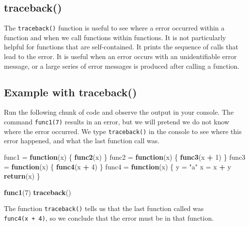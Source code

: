 \documentclass[
]{book}
\newenvironment{Shaded}{\begin{snugshade}}{\end{snugshade}}
\newcommand{\ControlFlowTok}[1]{\textcolor[rgb]{0.13,0.29,0.53}{\textbf{#1}}}
\newcommand{\DecValTok}[1]{\textcolor[rgb]{0.00,0.00,0.81}{#1}}
\newcommand{\KeywordTok}[1]{\textcolor[rgb]{0.13,0.29,0.53}{\textbf{#1}}}
\newcommand{\NormalTok}[1]{#1}
\newcommand{\OperatorTok}[1]{\textcolor[rgb]{0.81,0.36,0.00}{\textbf{#1}}}
\newcommand{\StringTok}[1]{\textcolor[rgb]{0.31,0.60,0.02}{#1}}
\begin{document}
\hypertarget{traceback}{%
\subsection{traceback()}\label{traceback}}

The \texttt{traceback()} function is useful to see where a error occurred within a function and when we call functions within functions. It is not particularly helpful for functions that are self-contained. It prints the sequence of calls that lead to the error. It is useful when an error occurs with an unidentifiable error message, or a large series of error messages is produced after calling a function.

\hypertarget{example-with-traceback}{%
\subsection*{Example with traceback()}\label{example-with-traceback}}

Run the following chunk of code and observe the output in your console. The command \texttt{func1(7)} results in an error, but we will pretend we do not know where the error occurred.
We type \texttt{traceback()} in the console to see where this error happened, and what the last function call was.

\begin{Shaded}
\begin{Highlighting}[]
\NormalTok{func1 =}\StringTok{ }\ControlFlowTok{function}\NormalTok{(x) \{}
    \KeywordTok{func2}\NormalTok{(x)}
\NormalTok{\}}
\NormalTok{func2 =}\StringTok{ }\ControlFlowTok{function}\NormalTok{(x) \{}
    \KeywordTok{func3}\NormalTok{(x }\OperatorTok{+}\StringTok{ }\DecValTok{1}\NormalTok{)}
\NormalTok{\}}
\NormalTok{func3 =}\StringTok{ }\ControlFlowTok{function}\NormalTok{(x) \{}
    \KeywordTok{func4}\NormalTok{(x }\OperatorTok{+}\StringTok{ }\DecValTok{4}\NormalTok{)}
\NormalTok{\}}
\NormalTok{func4 =}\StringTok{ }\ControlFlowTok{function}\NormalTok{(x) \{}
\NormalTok{    y =}\StringTok{ "a"}
\NormalTok{    x =}\StringTok{ }\NormalTok{x }\OperatorTok{+}\StringTok{ }\NormalTok{y}
    \KeywordTok{return}\NormalTok{(x)}
\NormalTok{\}}

\KeywordTok{func1}\NormalTok{(}\DecValTok{7}\NormalTok{)}
\KeywordTok{traceback}\NormalTok{()}
\end{Highlighting}
\end{Shaded}

The function \texttt{traceback()} tells us that the last function called was \texttt{func4(x\ +\ 4)}, so we conclude that the error must be in that function.
\end{document}
